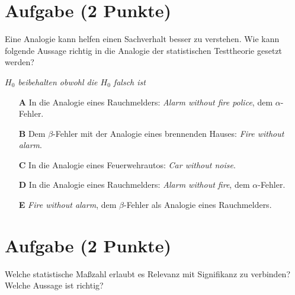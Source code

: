 \documentclass[a4paper, 9pt]{scrartcl}\usepackage[]{graphicx}\usepackage[]{xcolor}
\begin{document}

\section{Aufgabe \hfill (2 Punkte)}



Eine Analogie kann helfen einen Sachverhalt besser zu verstehen. Wie kann folgende Aussage richtig in die Analogie der statistischen Testtheorie gesetzt werden?

\begin{center}
\textit{$H_0$ beibehalten obwohl die $H_0$ falsch ist}
\end{center}



\begin{enumerate}
\item [\textbf{A} \msquare] In die Analogie eines Rauchmelders: \textit{Alarm without fire police}, dem $\alpha$-Fehler.
\item [\textbf{B} \msquare] Dem $\beta$-Fehler mit der Analogie eines brennenden Hauses: \textit{Fire without alarm}.
\item [\textbf{C} \msquare] In die Analogie eines Feuerwehrautos: \textit{Car without noise}.
\item [\textbf{D} \msquare] In die Analogie eines Rauchmelders: \textit{Alarm without fire}, dem $\alpha$-Fehler.
\item [\textbf{E} \msquare] \textit{Fire without alarm}, dem $\beta$-Fehler als Analogie eines Rauchmelders.
\end{enumerate}

\section{Aufgabe \hfill (2 Punkte)}



Welche statistische Maßzahl erlaubt es Relevanz mit Signifikanz zu verbinden? Welche Aussage ist richtig?
\end{document}
